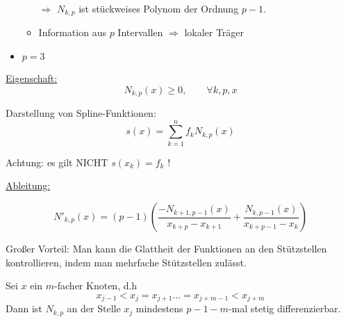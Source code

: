 \begin{bsp}
\begin{itemize}
\begin{itemize}
    $\Rightarrow$ $N_{k,p}$ ist stückweises Polynom der Ordnung $p-1$.

  \item Information aus $p$ Intervallen $\Rightarrow$ lokaler Träger
  \end{itemize}
\item $p=3$
\begin{center}
\end{center}
\end{itemize}
\end{bsp}

\underline{Eigenschaft:} 
\[N_{k,p}(x)\geq 0, \qquad \forall k, p, x\]

Darstellung von Spline-Funktionen:
\[s(x) = \sum_{k=1}^n f_kN_{k,p}(x)\]

Achtung: es gilt NICHT $s(x_k) = f_k$ !

\underline{Ableitung:} 

\[ N'_{k, p}(x)= (p-1)\left(\frac{-N_{k+1, p-1}(x)}{x_{k+p} - x_{k+1}}+\frac{N_{k, p-1}(x)}{x_{k+p-1}-x_k}\right)\]


Großer Vorteil: Man kann die Glattheit der Funktionen an den Stützstellen kontrollieren, indem man mehrfache Stützstellen zulässt.

\begin{satz}
  Sei $x$ ein $m$-facher Knoten, d.h
\[x_{j-1} < x_j = x_{j+1} \dots = x_{j+m-1} < x_{j+m}\]
Dann ist $N_{k,p}$ an der Stelle $x_j$ mindestens $p-1-m$-mal stetig differenzierbar.
\end{satz}
